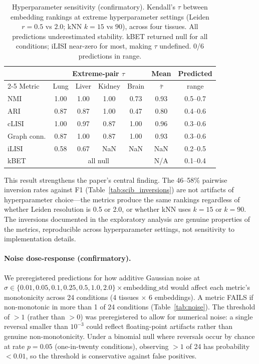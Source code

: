 \documentclass[10pt,letterpaper]{article}
\begin{document}
\begin{table}[t]
\centering
\caption{Hyperparameter sensitivity (confirmatory). Kendall's $\tau$ between embedding rankings at extreme hyperparameter settings (Leiden $r = 0.5$ vs $2.0$; kNN $k = 15$ vs $90$), across four tissues. All predictions underestimated stability. kBET returned null for all conditions; iLISI near-zero for most, making $\tau$ undefined. 0/6 predictions in range.}
\label{tab:hyperparam}
\small
\begin{tabular}{@{}lcccccc@{}}
\toprule
 & \multicolumn{4}{c}{Extreme-pair $\tau$} & Mean & Predicted \\
\cmidrule(lr){2-5}
Metric & Lung & Liver & Kidney & Brain & $\bar{\tau}$ & range \\
\midrule
NMI & 1.00 & 1.00 & 1.00 & 0.73 & 0.93 & 0.5--0.7 \\
ARI & 0.87 & 0.87 & 1.00 & 0.47 & 0.80 & 0.4--0.6 \\
cLISI & 1.00 & 0.97 & 0.87 & 1.00 & 0.96 & 0.3--0.6 \\
Graph conn. & 0.87 & 1.00 & 0.87 & 1.00 & 0.93 & 0.3--0.6 \\
iLISI & 0.58 & 0.67 & NaN & NaN & NaN & 0.2--0.5 \\
kBET & \multicolumn{4}{c}{all null} & N/A & 0.1--0.4 \\
\bottomrule
\end{tabular}
\end{table}

This result strengthens the paper's central finding. The 46--58\% pairwise inversion rates against F1 (Table~\ref{tab:scib_inversions}) are not artifacts of hyperparameter choice---the metrics produce the same rankings regardless of whether Leiden resolution is 0.5 or 2.0, or whether kNN uses $k = 15$ or $k = 90$. The inversions documented in the exploratory analysis are genuine properties of the metrics, reproducible across hyperparameter settings, not sensitivity to implementation details.

\paragraph{Noise dose-response (confirmatory).} We preregistered predictions for how additive Gaussian noise at $\sigma \in \{0.01, 0.05, 0.1, 0.25, 0.5, 1.0, 2.0\} \times \text{embedding\_std}$ would affect each metric's monotonicity across 24 conditions (4 tissues $\times$ 6 embeddings). A metric FAILS if non-monotonic in more than 1 of 24 conditions (Table~\ref{tab:noise}). The threshold of $>1$ (rather than $>0$) was preregistered to allow for numerical noise: a single reversal smaller than $10^{-3}$ could reflect floating-point artifacts rather than genuine non-monotonicity. Under a binomial null where reversals occur by chance at rate $p = 0.05$ (one-in-twenty conditions), observing $>1$ of 24 has probability $< 0.01$, so the threshold is conservative against false positives.
\end{document}

